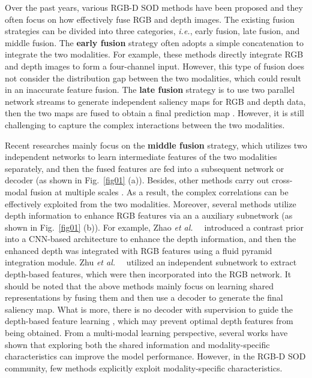 \documentclass[10pt,twocolumn,letterpaper]{article}
\def\ie{\emph{i.e.}}
\def\etal{{\em et al.~}}
\begin{document}
Over the past years, various RGB-D SOD methods have been proposed and they often focus on how effectively fuse RGB and depth images. The existing fusion strategies can be divided into three categories, \ie, early fusion, late fusion, and middle fusion. The \textbf{early fusion} strategy often adopts a simple concatenation to integrate the two modalities. For example, these methods \cite{peng2014rgbd,ren2015exploiting,song2017depth,liu2019salient} directly integrate RGB and depth images to form a four-channel input. However, this type of fusion does not consider the distribution gap between the two modalities, which could result in an inaccurate feature fusion. The \textbf{late fusion} strategy is to use two parallel network streams to generate independent saliency maps for RGB and depth data, then the two maps are fused to obtain a final prediction map \cite{guo2016salient,wang2019adaptive,ding2019depth}. However, it is still challenging to capture the complex interactions between the two modalities.


Recent researches mainly focus on the \textbf{middle fusion} strategy, which utilizes two independent networks to learn intermediate features of the two modalities separately, and then the fused features are fed into a subsequent network or decoder (as shown in Fig.~\ref{fig01} (a)). Besides, other methods carry out cross-modal fusion at multiple scales \cite{chen2018attention,chen2018progressively,liu2019two,chen2019three,han2017cnns,ji2021calibrated,huang2021multi}. As a result, the complex correlations can be effectively exploited from the two modalities. Moreover, several methods utilize depth information to enhance RGB features via an a auxiliary subnetwork \cite{chen2019multi,zhao2019contrast,zhu2019pdnet} (as shown in Fig.~\ref{fig01} (b)). For example, Zhao \etal~\cite{zhao2019contrast} introduced a contrast prior into a CNN-based architecture to enhance the depth information, and then the enhanced depth was integrated with RGB features using a fluid pyramid integration module. Zhu \etal~\cite{zhu2019pdnet} utilized an independent subnetwork to extract depth-based features, which were then incorporated into the RGB network. It should be noted that the above methods mainly focus on learning shared representations by fusing them and then use a decoder to generate the final saliency map. What is more, there is no decoder with supervision to guide the depth-based feature learning \cite{zhao2019contrast,zhu2019pdnet}, which may prevent optimal depth features from being obtained. From a multi-modal learning perspective, several works \cite{hu2017sharable,lu2020cross,zhou2019dual,zhou2020hi} have shown that exploring both the shared information and modality-specific characteristics can improve the model performance. However, in the RGB-D SOD community, few methods explicitly exploit modality-specific characteristics.
\end{document}

